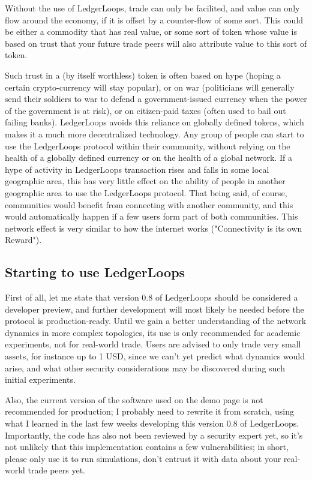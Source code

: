 \documentclass[11pt,twoside,a4paper]{article}
\begin{document}
Without the use of LedgerLoops, trade can only be facilited, and value can only flow around the economy, if it is offset by a counter-flow of some sort. This could be either a commodity that has real value, or some sort of token whose value is based on trust that your future trade peers will also attribute value to this sort of token.

Such trust in a (by itself worthless) token is often based on hype (hoping a certain crypto-currency will stay popular), or on war (politicians will generally send their soldiers to war to defend a government-issued currency when the power of the government is at risk), or on citizen-paid taxes (often used to bail out failing banks). LedgerLoops avoids this reliance on globally defined tokens, which makes it a much more decentralized technology. Any group of people can start to use the LedgerLoops protocol within their community, without relying on the health of a globally defined currency or on the health of a global network. If a hype of activity in LedgerLoops transaction rises and falls in some local geographic area, this has very little effect on the ability of people in another geographic area to use the LedgerLoops protocol. That being said, of course, communities would benefit from connecting with another community, and this would automatically happen if a few users form part of both communities. This network effect is very similar to how the internet works ("Connectivity is its own Reward").

\subsection{Starting to use LedgerLoops}
First of all, let me state that version 0.8 of LedgerLoops should be considered a developer preview, and further development will most likely be needed before the protocol is production-ready. Until we gain a better understanding of the network dynamics in more complex topologies, its use is only recommended for academic experiments, not for real-world trade. Users are advised to only trade very small assets, for instance up to 1 USD, since we can't yet predict what dynamics would arise, and what other security considerations may be discovered during such initial experiments.

Also, the current version of the software used on the demo page is not recommended for production; I probably need to rewrite it from scratch, using what I learned in the last few weeks developing this version 0.8 of LedgerLoops. Importantly, the code has also not been reviewed by a security expert yet, so it's not unlikely that this implementation contains a few vulnerabilities; in short, please only use it to run simulations, don't entrust it with data about your real-world trade peers yet.
\end{document}
